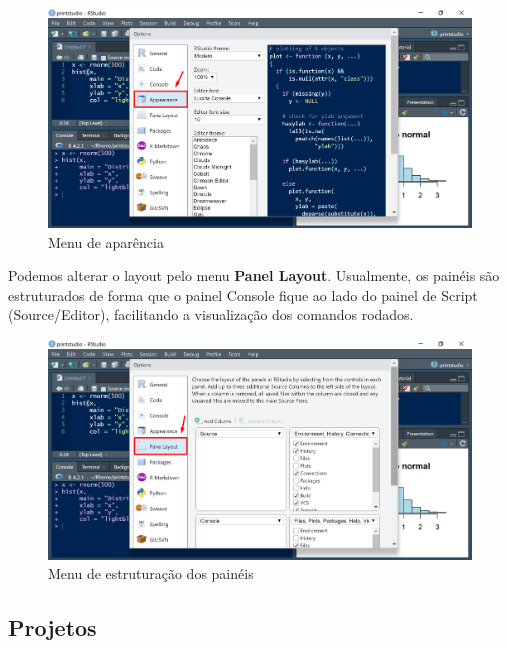 \documentclass[
  letterpaper,
  DIV=11,
  numbers=noendperiod]{scrreprt}
\begin{document}
\begin{figure}

{\centering \includegraphics[width=1\textwidth,height=\textheight]{./figuras_tutorialR/rstudio3.png}

}

\caption{Menu de aparência}

\end{figure}

Podemos alterar o layout pelo menu \textbf{Panel Layout}. Usualmente, os
painéis são estruturados de forma que o painel Console fique ao lado do
painel de Script (Source/Editor), facilitando a visualização dos
comandos rodados.

\begin{figure}

{\centering \includegraphics[width=1\textwidth,height=\textheight]{./figuras_tutorialR/rstudio4.png}

}

\caption{Menu de estruturação dos painéis}

\end{figure}

\hypertarget{projetos}{%
\subsection{Projetos}\label{projetos}}
\end{document}
